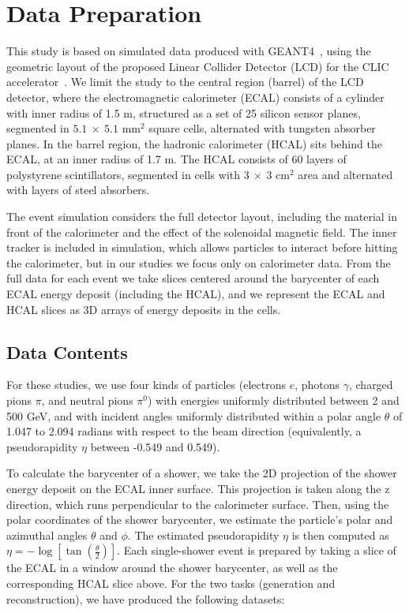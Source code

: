 \chapter{Data Preparation}\label{sec:data}

This study is based on simulated data produced with GEANT4~\cite{GEANT4}, using the geometric layout of the proposed Linear Collider Detector (LCD) for the CLIC accelerator~\cite{Lebrun:2012hj}. We limit the study to the central region (barrel) of the LCD detector, where the electromagnetic calorimeter (ECAL) consists of a cylinder with inner radius of 1.5 m, structured as a set of 25 silicon sensor planes, segmented in $5.1~\times~5.1$ mm$^2$ square cells, alternated with tungsten absorber planes. In the barrel region, the hadronic calorimeter (HCAL) sits behind the ECAL, at an inner radius of 1.7 m. The HCAL 
consists of 60 layers of polystyrene scintillators, segmented in cells with  $3~\times~3$ cm$^2$ area and alternated with layers of steel absorbers. 

The event simulation considers the full detector layout, including the material in front of the calorimeter and the effect of the solenoidal magnetic field. The inner tracker is included in simulation, which allows particles to interact before hitting the calorimeter, but in our studies we focus only on calorimeter data. From the full data for each event we take slices centered around the barycenter of each ECAL energy deposit (including the HCAL), and we represent the ECAL and HCAL slices as 3D arrays of energy deposits in the cells.

\section{Data Contents}

For these studies, we use four kinds of particles (electrons $e$, photons $\gamma$, charged pions $\pi$, and neutral pions $\pi^0$) with energies uniformly distributed between 2 and 500 GeV, and with incident angles uniformly distributed within a polar angle $\theta$ of 1.047 to 2.094 radians with respect to the beam direction (equivalently, a pseudorapidity $\eta$ between -0.549 and 0.549).

To calculate the barycenter of a shower, we take the 2D projection of the shower energy deposit on the ECAL inner surface. This projection is taken along the z direction, which runs perpendicular to the calorimeter surface. Then, using the polar coordinates of the shower barycenter, we estimate the particle's polar and azimuthal angles $\theta$ and $\phi$. The estimated pseudorapidity $\eta$ is then computed as $\eta=-\log[\tan\left(\frac{\theta}{2}\right)]$. Each single-shower event is prepared by taking a slice of the ECAL in a window around the shower barycenter, as well as the corresponding HCAL slice above. For the two tasks (generation and reconstruction), we have produced the following datasets:

